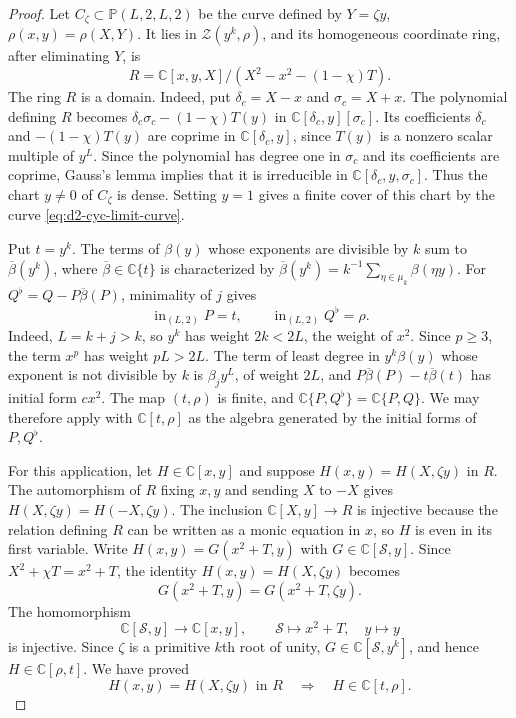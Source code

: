 \documentclass[11pt,letterpaper]{article}
\numberwithin{equation}{section}
\theoremstyle{remark}
\theoremstyle{plain}
\newcommand{\C}{\mathbb{C}}
\begin{document}
\begin{proof}
Let $C_\zeta\subset\mathbb P(L,2,L,2)$ be the curve defined by
$Y=\zeta y$, $\rho(x,y)=\rho(X,Y)$.
It lies in $\mathcal Z(y^k,\rho)$, and its homogeneous coordinate
ring, after eliminating $Y$, is
\[
 R=\C[x,y,X]/(X^2-x^2-(1-\chi)T).
\]
The ring $R$ is a domain.  Indeed, put $\delta_c=X-x$ and
$\sigma_c=X+x$.  The polynomial defining $R$ becomes
$\delta_c\sigma_c-(1-\chi)T(y)$ in $\C[\delta_c,y][\sigma_c]$.
Its coefficients $\delta_c$ and $-(1-\chi)T(y)$ are coprime in
$\C[\delta_c,y]$, since $T(y)$ is a nonzero scalar multiple of
$y^L$.  Since the polynomial has degree one in $\sigma_c$ and its
coefficients are coprime, Gauss's lemma implies that it is irreducible in
$\C[\delta_c,y,\sigma_c]$.
Thus the chart $y\neq0$ of $C_\zeta$ is dense.  Setting $y=1$ gives
a finite cover of this chart by the curve \eqref{eq:d2-cyc-limit-curve}.

Put $t=y^k$.  The terms of $\beta(y)$ whose exponents are divisible
by $k$ sum to $\overline\beta(y^k)$, where
$\overline\beta\in\C\{t\}$ is characterized by
$\overline\beta(y^k)=k^{-1}\sum_{\eta\in\mu_k}\beta(\eta y)$.
For $Q^\flat=Q-P\overline\beta(P)$, minimality of $j$ gives
\begin{equation}
 \operatorname{in}_{(L,2)}P=t,\qquad
 \operatorname{in}_{(L,2)}Q^\flat=\rho.
 \label{eq:d2-cyc-second-initial}
\end{equation}
Indeed, $L=k+j>k$, so $y^k$ has weight $2k<2L$, the weight of $x^2$.
Since $p\geq3$, the term $x^p$ has weight $pL>2L$.
The term of least degree in $y^k\beta(y)$ whose exponent is not
divisible by $k$ is $\beta_jy^L$,
of weight $2L$, and
$P\overline\beta(P)-t\overline\beta(t)$ has initial form $cx^2$.
The map $(t,\rho)$ is finite, and
$\C\{P,Q^\flat\}=\C\{P,Q\}$.  We may therefore apply
 with $\C[t,\rho]$ as the algebra generated
by the initial forms of $P,Q^\flat$.

For this application, let $H\in\C[x,y]$ and suppose
$H(x,y)=H(X,\zeta y)$ in $R$.
The automorphism of $R$ fixing $x,y$ and sending $X$ to $-X$ gives
$H(X,\zeta y)=H(-X,\zeta y)$.
The inclusion $\C[X,y]\to R$ is injective because the
relation defining $R$ can be written as a monic equation in $x$, so
$H$ is even in its first variable.  Write $H(x,y)=G(x^2+T,y)$
with $G\in\C[\mathcal S,y]$.
Since $X^2+\chi T=x^2+T$, the identity $H(x,y)=H(X,\zeta y)$ becomes
\[
 G(x^2+T,y)=G(x^2+T,\zeta y).
\]
The homomorphism
\[
 \C[\mathcal S,y]\longrightarrow\C[x,y],\qquad
 \mathcal S\longmapsto x^2+T,\quad y\longmapsto y
\]
is injective.
Since $\zeta$ is a primitive $k$th root of unity,
$G\in\C[\mathcal S,y^k]$, and hence $H\in\C[\rho,t]$.
We have proved
\begin{equation}
 H(x,y)=H(X,\zeta y)\text{ in }R
 \quad\Longrightarrow\quad H\in\C[t,\rho].         \label{eq:d2-cyc-equalizer}
\end{equation}


\end{proof}
\end{document}
